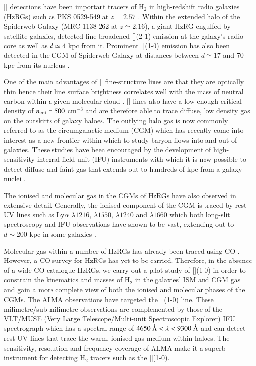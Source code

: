 [] detections have been important tracers of H$_2$ in high-redshift radio galaxies (HzRGs) such as PKS 0529-549 at $z=2.57$ \citep{Man2019}. Within the extended halo of the Spiderweb Galaxy (MRC 1138-262 at $z\simeq2.16$), a giant HzRG engulfed by satellite galaxies, \citet{Gullberg2016b} detected line-broadened [](2-1) emission at the galaxy's radio core as well as $d \simeq 4$ kpc from it. Prominent [](1-0) emission has also been detected in the CGM of Spiderweb Galaxy at distances between $d \simeq 17$ and 70 kpc from its nucleus \citep{emonts2018}. 

One of the main advantages of [] fine-structure lines are that they are optically thin hence their line surface brightness correlates well with the mass of neutral carbon within a given molecular cloud \citep{Nesvadba2019}. [] lines also have a low enough critical density of $n_{\rm crit} = 500$ cm$^{-3}$ and are therefore able to trace diffuse, low density gas on the outskirts of galaxy haloes. The outlying halo gas is now commonly referred to as the circumgalactic medium (CGM) which has recently come into interest as a new frontier within which to study baryon flows into and out of galaxies. These studies have been encouraged by the development of high-sensitivity integral field unit (IFU) instruments with which it is now possible to detect diffuse and faint gas that extends out to hundreds of kpc from a galaxy nuclei \citep{tumlinson2017}. 

The ionised and molecular gas in the CGMs of HzRGs have also observed in extensive detail. Generally, the ionised component of the CGM is traced by rest-UV lines such as Ly$\alpha$ $\lambda1216$,  $\lambda1550$,  $\lambda1240$ and \ion{O}{III]} $\lambda1660$ which both long-slit spectroscopy and IFU observations have shown to be vast, extending out to $d\sim200$ kpc in some galaxies \citep{reuland2003,villar-martin2003,humphrey2007,swinbank2015,morais2017,silva2018b}. 

Molecular gas within a number of HzRGs has already been traced using CO \citep{Emonts2011,Emonts2014,Gullberg2016b}. However, a CO survey for HzRGs has yet to be carried. Therefore, in the absence of a wide CO catalogue HzRGs, we carry out a pilot study of [](1-0) in order to constrain the kinematics and masses of H$_2$ in the galaxies' ISM and CGM gas and gain a more complete view of both the ionised and molecular phases of the CGMs. The ALMA observations have targeted the [](1-0) line. These milimetre/sub-milimetre observations are complemented by those of the VLT/MUSE (Very Large Telescope/Multi-unit Spectroscopic Explorer) IFU spectrograph which has a spectral range of $4650~\mbox{\normalfont\AA } < \lambda < 9300~\mbox{\normalfont\AA }$ and can detect rest-UV lines that trace the warm, ionised gas medium within haloes. The sensitivity, resolution and frequency coverage of ALMA make it a superb instrument for detecting H$_2$ tracers such as the [](1-0).

